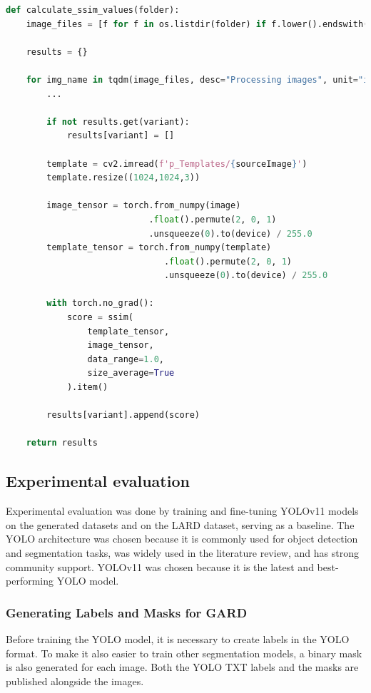 \begin{lstlisting}[language=Python, caption={Evaluation, SSIM score calculation}]
def calculate_ssim_values(folder):
    image_files = [f for f in os.listdir(folder) if f.lower().endswith(".png") and not f.lower().endswith(".mask.png")]

    results = {}
    
    for img_name in tqdm(image_files, desc="Processing images", unit="img"):
        ...

        if not results.get(variant):
            results[variant] = []

        template = cv2.imread(f'p_Templates/{sourceImage}')
        template.resize((1024,1024,3))

        image_tensor = torch.from_numpy(image)
                            .float().permute(2, 0, 1)
                            .unsqueeze(0).to(device) / 255.0
        template_tensor = torch.from_numpy(template)
                               .float().permute(2, 0, 1)
                               .unsqueeze(0).to(device) / 255.0

        with torch.no_grad():
            score = ssim(
                template_tensor,
                image_tensor,
                data_range=1.0,
                size_average=True
            ).item()

        results[variant].append(score)

    return results
\end{lstlisting}

\subsection{Experimental evaluation}

Experimental evaluation was done by training and fine-tuning YOLOv11 models on
the generated datasets and on the LARD dataset, serving as a baseline. The YOLO
architecture was chosen because it is commonly used for object detection and
segmentation tasks, was widely used in the literature review, and has strong community
support. YOLOv11 was chosen because it is the latest and best-performing YOLO model.

\subsubsection{Generating Labels and Masks for GARD}

Before training the YOLO model, it is necessary to create labels in the YOLO
format. To make it also easier to train other segmentation models, a binary mask
is also generated for each image. Both the YOLO TXT labels and the masks are
published alongside the images.


